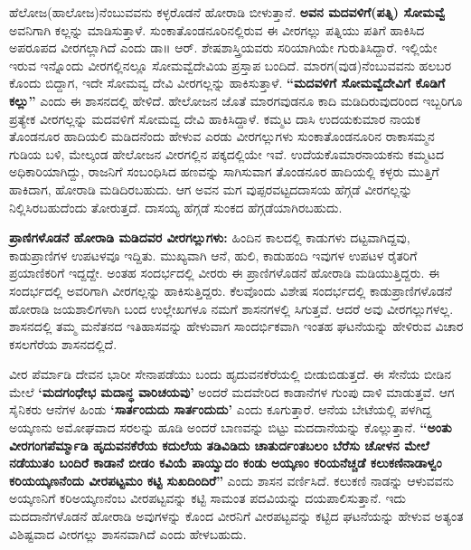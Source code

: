 ಹೆಲೋಜ(ಹಾಲೋಜ)ನೆಂಬುವವನು ಕಳ್ಳರೊಡನೆ ಹೋರಾಡಿ ಬೀಳುತ್ತಾನೆ. \textbf{ಅವನ ಮದವಳಿಗೆ(ಪತ್ನಿ) ಸೋಮವ್ವೆ } ಅವನಿಗಾಗಿ ಕಲ್ಲನ್ನು ಮಾಡಿಸುತ್ತಾಳೆ. ಸುಂಕಾತೊಂಡನೂರಿನಲ್ಲಿರುವ ಈ ವೀರಗಲ್ಲು ಪತ್ನಿಯು ಪತಿಗೆ ಹಾಕಿಸಿದ ಅಪರೂಪದ ವೀರಗಲ್ಲಾಗಿದೆ ಎಂದು ಡಾ॥ ಆರ್​. ಶೇಷಶಾಸ್ತ್ರಿಯವರು ಸರಿಯಾಗಿಯೇ ಗುರುತಿಸಿದ್ದಾರೆ. ಇಲ್ಲಿಯೇ ಇರುವ ಇನ್ನೊಂದು ವೀರಗಲ್ಲಿನಲ್ಲೂ ಸೋಮವ್ವೆದೇವಿಯ ಪ್ರಸ್ತಾಪ ಬಂದಿದೆ. ಮಾರಗ(ವುಡ)ನೆಂಬುವವನು ಹಲಬರ ಕೊಂದು ಬಿದ್ದಾಗ, ಇದೇ ಸೋಮವ್ವ ದೇವಿ ವೀರಗಲ್ಲನ್ನು ಹಾಕಿಸುತ್ತಾಳೆ. \textbf{“ಮದವಳಿಗೆ ಸೋಮವ್ವೆದೇವಿಗೆ ಕೊಡಿಗೆ ಕಲ್ಲು”} ಎಂದು ಈ ಶಾಸನದಲ್ಲಿ ಹೇಳಿದೆ. ಹೇಲೋಜನ ಜೊತೆ ಮಾರಗವುಡನೂ ಕಾದಿ ಮಡಿದಿರುವುದರಿಂದ ಇಬ್ಬರಿಗೂ ಪ್ರತ್ಯೇಕ ವೀರಗಲ್ಲನ್ನು ಮದವಳಿಗೆ ಸೋಮವ್ವ ದೇವಿ ಹಾಕಿಸಿದ್ದಾಳೆ. ಕಮ್ಮಟ ದಾಸಿ ಉದಯಕುಮಾರ ನಾಯಕ ತೊಂಡನೂರ ಹಾದಿಯಲಿ ಮಡಿದನೆಂದು ಹೇಳುವ ಎರಡು ವೀರಗಲ್ಲುಗಳು ಸುಂಕಾತೊಂಡನೂರಿನ ರಾಕಾಸಮ್ಮನ ಗುಡಿಯ ಬಳಿ, ಮೇಲ್ಕಂಡ ಹೇಲೋಜನ ವೀರಗಲ್ಲಿನ ಪಕ್ಕದಲ್ಲಿಯೇ ಇವೆ. ಉದೆಯಕೊಮಾರನಾಯಕನು ಕಮ್ಮಟದ ಅಧಿಕಾರಿಯಾಗಿದ್ದು, ರಾಜನಿಗೆ ಸಂಬಂಧಿಸಿದ ಹಣವನ್ನು ಸಾಗಿಸುವಾಗ ತೊಂಡನೂರ ಹಾದಿಯಲ್ಲಿ ಕಳ್ಳರು ಮುತ್ತಿಗೆ ಹಾಕಿದಾಗ, ಹೋರಾಡಿ ಮಡಿದಿರಬಹುದು. ಆಗ ಅವನ ಮಗ ವುಪ್ಪರವಟ್ಟದ\break ದಾಸಯ ಹೆಗ್ಗಡೆ ವೀರಗಲ್ಲನ್ನು ನಿಲ್ಲಿಸಿರಬಹುದೆಂದು ತೋರುತ್ತದೆ. ದಾಸಯ್ಯ ಹೆಗ್ಗಡೆ ಸುಂಕದ ಹೆಗ್ಗಡೆಯಾಗಿರಬಹುದು.

\textbf{ಪ್ರಾಣಿಗಳೊಡನೆ ಹೋರಾಡಿ ಮಡಿದವರ ವೀರಗಲ್ಲುಗಳು:} ಹಿಂದಿನ ಕಾಲದಲ್ಲಿ ಕಾಡುಗಳು ದಟ್ಟವಾಗಿದ್ದವು, ಕಾಡುಪ್ರಾಣಿಗಳ ಉಪಟಳವೂ ಇದ್ದಿತು. ಮುಖ್ಯವಾಗಿ ಆನೆ, ಹುಲಿ, ಕಾಡುಹಂದಿ ಇವುಗಳ ಉಪಟಳ ರೈತರಿಗೆ ಪ್ರಯಾಣಿಕರಿಗೆ ಇದ್ದದ್ದೇ. ಅಂತಹ ಸಂದರ್ಭದಲ್ಲಿ ವೀರರು ಈ ಪ್ರಾಣಿಗಳೊಡನೆ ಹೋರಾಡಿ ಮಡಿಯುತ್ತಿದ್ದರು. ಈ ಸಂದರ್ಭದಲ್ಲಿ ಅವರಿಗಾಗಿ ವೀರಗಲ್ಲನ್ನು ಹಾಕಿಸುತ್ತಿದ್ದರು. ಕೆಲವೊಂದು ವಿಶೇಷ ಸಂದರ್ಭದಲ್ಲಿ ಕಾಡುಪ್ರಾಣಿಗಳೊಡನೆ ಹೋರಾಡಿ ಜಯಶಾಲಿಗಳಾಗಿ ಬಂದ ಉಲ್ಲೇಖಗಳೂ ನಮಗೆ ಶಾಸನಗಳಲ್ಲಿ ಸಿಗುತ್ತವೆ. ಆದರೆ ಅವು ವೀರಗಲ್ಲುಗಳಲ್ಲ. ಶಾಸನದಲ್ಲಿ ತಮ್ಮ ಮನೆತನದ ಇತಿಹಾಸವನ್ನು ಹೇಳುವಾಗ ಸಾಂದರ್ಭಿಕವಾಗಿ ಇಂತಹ ಘಟನೆಯನ್ನು ಹೇಳಿರುವ ವಿಚಾರ ಕಸಲಗೆರೆಯ ಶಾಸನದಲ್ಲಿದೆ.

ವೀರ ಪೆರ್ಮಾಡಿ ದೇವನ ಭಾರೀ ಸೇನಾಪಡೆಯು ಬಂದು ಹೃದುವನಕೆರೆಯಲ್ಲಿ ಬೀಡುಬಿಡುತ್ತದೆ. ಈ ಸೇನೆಯ ಬೀಡಿನ ಮೇಲೆ \textbf{‘ಮದಗಂಧೇಭ ಮದಾನ್ಧ ವಾರಿಚಯವು’} ಅಂದರೆ ಮದವೇರಿದ ಕಾಡಾನೆಗಳ ಗುಂಪು ದಾಳಿ ಮಾಡುತ್ತವೆ. ಆಗ ಸೈನಿಕರು ಆನೆಗಳ ಹಿಂಡು \textbf{‘ಸಾರ್ತಂದುದು ಸಾರ್ತಂದುದು’} ಎಂದು ಕೂಗುತ್ತಾರೆ. ಆನೆಯ ಬೇಟೆಯಲ್ಲಿ ಪಳಗಿದ್ದ ಅಯ್ಕಣನು ಅಮೋಘವಾದ ಸರಲನ್ನು ಹೂಡಿ ಅಂದರೆ ಬಾಣವನ್ನು ಬಿಟ್ಟು ಮದದಾನೆಯನ್ನು ಕೊಲ್ಲುತ್ತಾನೆ.\textbf{ “ಅಂತು ವೀರಗಂಗ\break ಪೆರ್ಮ್ಮಾಡಿ ಹೃದುವನಕೆರೆಯ ಕದುಲೆಯ ತಡಿವಿಡಿದು ಚಾತುರ್ದಂತಬಲಂ ಬೆರೆಸು ಚೋಳನ ಮೇಲೆ ನಡೆಯುತಂ ಬಂದಿರೆ ಕಾಡಾನೆ ಬೀಡಂ ಕವಿಯೆ ಪಾಯ್ವುದಂ ಕಂಡು ಅಯ್ಕಣಂ ಕರಿಯನೆಚ್ಚಡೆ ಕಲುಕಣಿನಾಡಾಳ್ವಂ ಕರಿಯಯ್ಕಣನೆಂದು ವೀರಪಟ್ಟಮಂ ಕಟ್ಟಿ ಸುಖದಿಂದಿರೆ”} ಎಂದು ಶಾಸನ ವರ್ಣಿಸಿದೆ. ಕಲುಕಣಿ ನಾಡನ್ನು ಆಳುವವನು ಅಯ್ಕಣನಿಗೆ ಕರಿಅಯ್ಕಣನೆಂಬ ವೀರಪಟ್ಟವನ್ನು ಕಟ್ಟಿ ಸಾಮಂತ ಪದವಿಯನ್ನು ದಯಪಾಲಿಸುತ್ತಾನೆ. ಇದು ಮದದಾನೆಗಳೊಡನೆ ಹೋರಾಡಿ ಅವುಗಳನ್ನು ಕೊಂದ ವೀರನಿಗೆ ವೀರಪಟ್ಟವನ್ನು ಕಟ್ಟಿದ ಘಟನೆಯನ್ನು ಹೇಳುವ ಅತ್ಯಂತ ವಿಶಿಷ್ಟವಾದ ವೀರಗಲ್ಲು ಶಾಸನವಾಗಿದೆ ಎಂದು ಹೇಳಬಹುದು.

